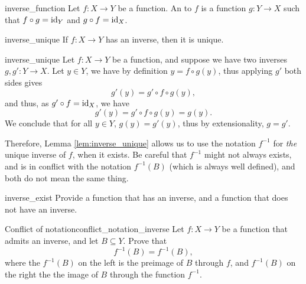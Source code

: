 \begin{cdef}{}{inverse_function}
    Let \( f : X \to Y \) be a function. An  to \( f \) is a function \( g : Y \to X \) such that \( f \circ g = \mathrm{id}_Y \) and \( g \circ f = \mathrm{id}_X \).
\end{cdef}

\begin{clem}{}{inverse_unique}
    If \( f : X \to Y \) has an inverse, then it is unique.      
\end{clem}
\begin{lemproof}{inverse_unique}
    Let \( f : X \to Y \) be a function, and suppose we have two inverses \( g, g' : Y \to X \). Let \( y \in Y \), we have by definition \( y = f\circ g(y) \), thus applying \( g' \) both sides gives
    \begin{equation*}
        g'(y) = g'\circ f\circ g(y),
    \end{equation*}
    and thus, as \( g'\circ f = \mathrm{id}_X \), we have
    \begin{equation*}
        g'(y) = g'\circ f\circ g(y) = g(y).
    \end{equation*}
    We conclude that for all \( y \in Y \), \( g(y) = g'(y) \), thus by extensionality, \( g = g' \).
\end{lemproof}

Therefore, Lemma \ref{lem:inverse_unique} allows us to use the notation \( f^{-1} \) for \textit{the} unique inverse of \( f \), when it exists. Be careful that \( f^{-1} \) might not always exists, and is in conflict with the notation \( f^{-1}(B) \) (which is always well defined), and both do not mean the same thing.

\begin{cex}{}{inverse_exist}
    Provide a function that has an inverse, and a function that does not have an inverse.
\end{cex}

\begin{cex}{Conflict of notation}{conflict_notation_inverse}
    Let \( f : X \to Y \) be a function that admits an inverse, and let \( B \subseteq Y \). Prove that
    \begin{equation*}
        f^{-1}(B) = f^{-1}(B),
    \end{equation*}
    where the \( f^{-1}(B) \) on the left is the preimage of \( B \) through \( f \), and \( f^{-1}(B) \) on the right the the image of \( B \) through the function \( f^{-1} \).
\end{cex}

